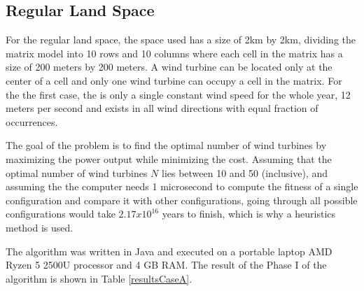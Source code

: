     \subsection{Regular Land Space}
    For the regular land space, the space used has a size of 2km by 2km, dividing the matrix model into 10 rows and 10 columns where each cell in the matrix has a size of 200 meters by 200 meters. A wind turbine can be located only at the center of a cell and only one wind turbine can occupy a cell in the matrix. For the the first case, the is only a single constant wind speed for the whole year, 12 meters per second and exists in all wind directions with equal fraction of occurrences.
    
    The goal of the problem is to find the optimal number of wind turbines by maximizing the power output while minimizing the cost. Assuming that the optimal number of wind turbines $N$ lies between 10 and 50 (inclusive), and assuming the the computer needs 1 microsecond to compute the fitness of a single configuration and compare it with other configurations, going through all possible configurations would take $2.17x10^{16}$ years to finish, which is why a heuristics method is used.
    
    The algorithm was written in Java and executed on a portable laptop AMD Ryzen 5 2500U processor and 4 GB RAM. The result of the Phase I of the algorithm is shown in Table \ref{resultsCaseA}.
    

